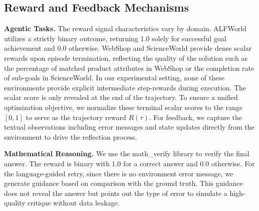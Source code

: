 \begin{table}[h]
\centering
\small
{}
\caption{Method-specific hyperparameters. R$^3$L omits KL regularization entirely.}
\label{tab:method_params}
\end{table}

\subsection{Reward and Feedback Mechanisms}

\textbf{Agentic Tasks.} The reward signal characteristics vary by domain. ALFWorld utilizes a strictly binary outcome, returning 1.0 solely for successful goal achievement and 0.0 otherwise. WebShop and ScienceWorld provide dense scalar rewards upon episode termination, reflecting the quality of the solution such as the percentage of matched product attributes in WebShop or the completion rate of sub-goals in ScienceWorld. In our experimental setting, none of these environments provide explicit intermediate step-rewards during execution. The scalar score is only revealed at the end of the trajectory. To ensure a unified optimization objective, we normalize these terminal scalar scores to the range $[0, 1]$ to serve as the trajectory reward $R(\tau)$. For feedback, we capture the textual observations including error messages and state updates directly from the environment to drive the reflection process.

\textbf{Mathematical Reasoning.} We use the math\_verify library to verify the final answer. The reward is binary with 1.0 for a correct answer and 0.0 otherwise. For the language-guided retry, since there is no environment error message, we generate guidance based on comparison with the ground truth. This guidance does not reveal the answer but points out the type of error to simulate a high-quality critique without data leakage.


